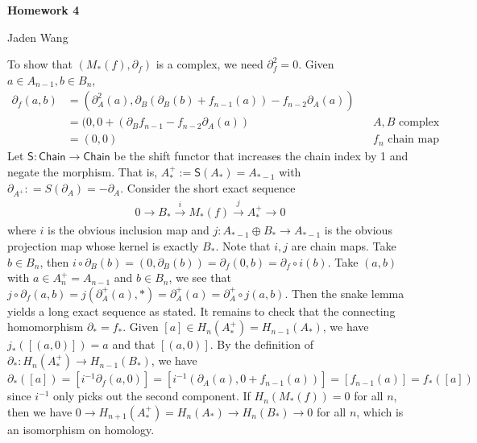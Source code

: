 \documentclass[12pt]{article}
\begin{document}
\centerline {\textsf{\textbf{\LARGE{Homework 4}}}}
\centerline {Jaden Wang}
\vspace{.15in}
\begin{problem}[1]
To show that $ (M_*(f), \partial_f) $ is a complex, we need $ \partial _f^2 = 0$. Given $ a \in A_{n-1}, b \in B_n$,
\begin{align*}
	\partial _f(a,b) &= \left(  \partial _A^2(a), \partial _B(\partial _B(b)+f_{n-1}(a)) -f_{n-2} \partial _A(a)\right)     \\
			 &= (0, 0+ (\partial _B f_{n-1} - f_{n-2} \partial _A (a)) && A,B \text{ complex} \\
	&= (0,0) && f_n \text{ chain map} 
\end{align*}
Let $ \textsf{S} : \textsf{Chain} \to \textsf{Chain}$ be the shift functor that increases the chain index by 1 and negate the morphism. That is, $ A_*^{+} := \textsf{S}(A_*) = A_{*-1}$ with $\partial _{A^{+}} : =S(\partial_A) = - \partial_A$. Consider the short exact sequence
\begin{align*}
	0 \to B_* \xrightarrow{ i} M_*(f) \xrightarrow{ j} A_{*}^{+} \to 0 
\end{align*}
where $ i$ is the obvious inclusion map and  $ j: A_{*-1} \oplus B_* \to A_{*-1}$ is the obvious projection map whose kernel is exactly $ B_*$. Note that $ i,j$ are chain maps. Take $ b \in B_n$, then $ i \circ \partial _B (b) = (0, \partial _B(b)) = \partial _f(0,b) =\partial _f \circ i(b)$. Take $ (a,b)$ with $ a \in A_n^{+} = A_{n-1}$ and $ b \in B_n$, we see that $ j \circ \partial _f (a,b) = j( \partial_A^{+} (a),*) = \partial _A^{+} (a) = \partial _A^{+} \circ j(a,b)$. Then the snake lemma yields a long exact sequence as stated. It remains to check that the connecting homomorphism $ \partial_* = f_{*}$. Given $ [a] \in H_n(A_*^{+}) = H_{n-1}(A_*)$, we have $ j_*([(a,0)]) = a$ and that $ [(a,0)] $. By the definition of $ \partial _*: H_n(A_*^{+}) \to H_{n-1}(B_*)$, we have $ \partial _*([a]) = [i ^{-1} \partial _f(a,0)] = [i^{-1} (\partial _A(a),0+f_{n-1}(a))] = [f_{n-1}(a)] = f_*([a])$ since $ i^{-1}$ only picks out the second component. If $ H_n(M_*(f)) = 0$ for all $ n$, then we have $0 \to H_{n+1}(A_*^{+}) = H_n (A_*) \to H_n(B_*) \to 0$ for all $ n$, which is an isomorphism  on homology.
\end{problem}
\end{document}
